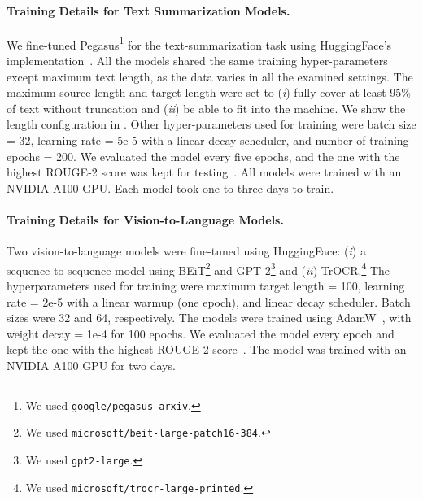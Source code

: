 \paragraph{Training Details for Text Summarization Models.}
We fine-tuned Pegasus\footnote{We used \texttt{google/pegasus-arxiv}.} for the text-summarization task using HuggingFace's implementation~\cite{wolf-etal-2020-transformers}. 
All the models shared the same training hyper-parameters except maximum text length, 
as the data varies in all the examined settings. 
The maximum source length and target length were set to 
(\textit{i}) fully cover at least 95\% of text without truncation and 
(\textit{ii}) be able to fit into the machine. 
We show the length configuration in . 
Other hyper-parameters used for training were 
batch size = 32, learning rate = 5e-5 with a linear decay scheduler, and number of training epochs = 200. 
We evaluated the model every five epochs, and the one with the highest ROUGE-2 score was kept for testing~\cite{liu-liu-2021-simcls,zhong-etal-2020-extractive,xu-etal-2020-discourse}. 
All models were trained with an NVIDIA A100 GPU. Each model took one to three days to train.




\paragraph{Training Details for Vision-to-Language Models.}
Two vision-to-language models were fine-tuned using HuggingFace:
(\textit{i}) a sequence-to-sequence model using BEiT\footnote{We used \texttt{microsoft/beit-large-patch16-384}.} and GPT-2\footnote{We used \texttt{gpt2-large}.}
and (\textit{ii}) TrOCR.\footnote{We used \texttt{microsoft/trocr-large-printed}.}  
The hyperparameters used for training were maximum target length = 100, 
learning rate = 2e-5 with a linear warmup (one epoch), and linear decay scheduler. 
Batch sizes were 32 and 64, respectively.
The models were trained using AdamW~\cite{loshchilov2018decoupled}, with weight decay = 1e-4 for 100 epochs. 
We evaluated the model every epoch and kept the one with the highest ROUGE-2 score~\cite{liu-liu-2021-simcls,zhong-etal-2020-extractive,xu-etal-2020-discourse}. 
The model was trained with an NVIDIA A100 GPU for two days.

